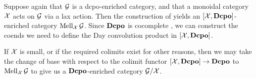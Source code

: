 \documentclass[11pt]{report}
\begin{document}
Suppose again that $\mathcal G$ is a dcpo-enriched category, and that a monoidal category $\mathcal X$ acts on $\mathcal G$ via a lax action.  
Then the construction of \Mellies yields an $[\mathcal X,{\normalfont\textbf{Dcpo}}]$-enriched category $\operatorname{Mell}_\mathcal X\mathcal G$.
Since ${\normalfont\textbf{Dcpo}}$ is cocomplete \cite{CocompleteDcpo}, we can construct the coends we need to define the Day convolution product in $[\mathcal X,{\normalfont\textbf{Dcpo}}]$.

If $\mathcal X$ is small, or if the required colimits exist for other reasons, then we may take the change of base with respect to the colimit functor $[\mathcal X,{\normalfont\textbf{Dcpo}}] \to {\normalfont\textbf{Dcpo}}$ to $\operatorname{Mell}_\mathcal X\mathcal G$ to give us a ${\normalfont\textbf{Dcpo}}$-enriched category $\mathcal G/\mathcal X$.



\end{document}
